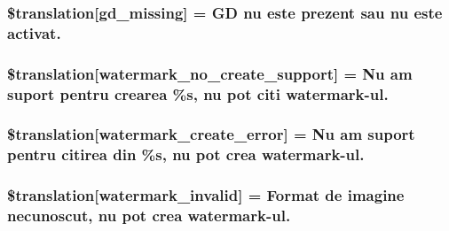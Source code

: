 \subsubsection[{\$translation}]{\setlength{\rightskip}{0pt plus 5cm}\$translation\mbox{[}\textquotesingle{}gd\+\_\+missing\textquotesingle{}\mbox{]} = \textquotesingle{}G\+D nu este prezent sau nu este activat.\textquotesingle{}}\label{class_8upload_8ro___r_o_8php_a7f3dfcc0db4bbc0f2e7210c439798e56}
\hypertarget{class_8upload_8ro___r_o_8php_a82d5853430ab72dc1f9799ec36144cc6}{}
\subsubsection[{\$translation}]{\setlength{\rightskip}{0pt plus 5cm}\$translation\mbox{[}\textquotesingle{}watermark\+\_\+no\+\_\+create\+\_\+support\textquotesingle{}\mbox{]} = \textquotesingle{}Nu am suport pentru crearea \%s, nu pot citi watermark-\/ul.\textquotesingle{}}\label{class_8upload_8ro___r_o_8php_a82d5853430ab72dc1f9799ec36144cc6}
\hypertarget{class_8upload_8ro___r_o_8php_aabca0b65dadbc6184415c16375f284ca}{}
\subsubsection[{\$translation}]{\setlength{\rightskip}{0pt plus 5cm}\$translation\mbox{[}\textquotesingle{}watermark\+\_\+create\+\_\+error\textquotesingle{}\mbox{]} = \textquotesingle{}Nu am suport pentru citirea din \%s, nu pot crea watermark-\/ul.\textquotesingle{}}\label{class_8upload_8ro___r_o_8php_aabca0b65dadbc6184415c16375f284ca}
\hypertarget{class_8upload_8ro___r_o_8php_ac336e7a5701e47ba4a05e9e498a3cc44}{}
\subsubsection[{\$translation}]{\setlength{\rightskip}{0pt plus 5cm}\$translation\mbox{[}\textquotesingle{}watermark\+\_\+invalid\textquotesingle{}\mbox{]} = \textquotesingle{}Format de imagine necunoscut, nu pot crea watermark-\/ul.\textquotesingle{}}\label{class_8upload_8ro___r_o_8php_ac336e7a5701e47ba4a05e9e498a3cc44}
\hypertarget{class_8upload_8ro___r_o_8php_a1ecb4673e4fb69e06b3f20b65cecf30a}{}
